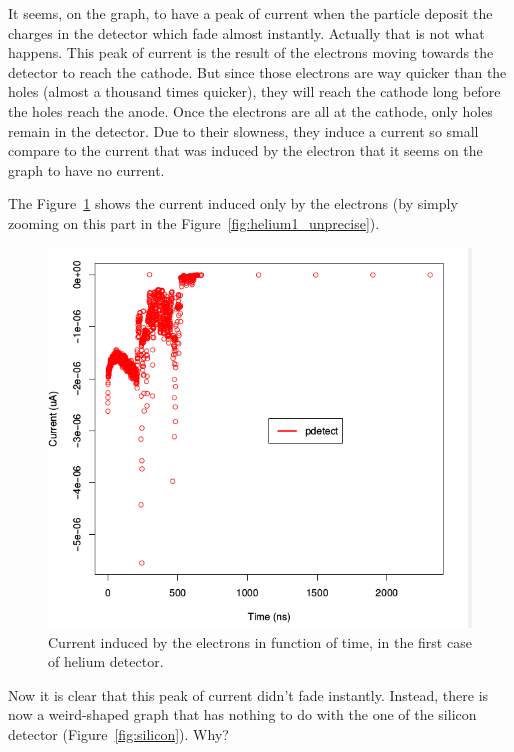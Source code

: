 \documentclass[11pt]{article}
\begin{document}
				It seems, on the graph, to have a peak of current when the particle deposit the charges in the
				detector which fade almost instantly. Actually that is not what happens. This peak of current
				is the result of the electrons moving towards the detector to reach the cathode. But since those
				electrons are way quicker than the holes (almost a thousand times quicker), they will reach the
				cathode long before the holes reach the anode. Once the electrons are all at the cathode, only holes
				remain in the detector. Due to their slowness, they induce a current so small compare to the
				current that was induced by the electron that it seems on the graph to have no current.

				The Figure~\ref{fig:helium1_precise} shows the current induced only by the electrons (by simply zooming
				on this part in the Figure~\ref{fig:helium1_unprecise}).

				\begin{figure}[H]
				  \center
				  \includegraphics[scale=0.5]{images/applications/helium1_precise.png}
				  \caption{Current induced by the electrons in function of time, in the first case of helium detector.}
				  \label{fig:helium1_precise}
				\end{figure}

				Now it is clear that this peak of current didn't fade instantly. Instead, there is now a weird-shaped
				graph that has nothing to do with the one of the silicon detector (Figure~\ref{fig:silicon}). Why?
\end{document}
